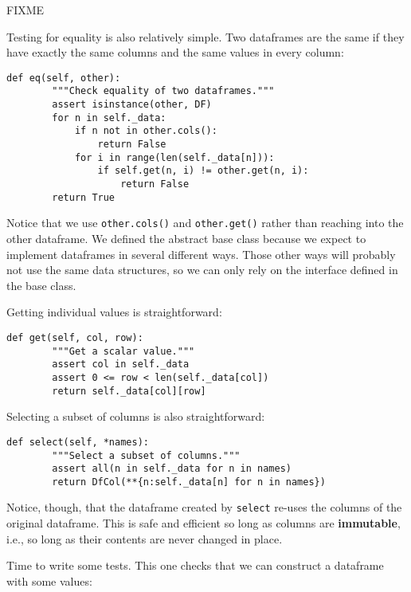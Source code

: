 \documentclass{scrbook}
\newcommand{\glossref}[1]{\textbf{#1}}
\begin{document}
FIXME


Testing for equality is also relatively simple.
Two dataframes are the same if they have exactly the same columns
and the same values in every column:


\begin{lstlisting}[frame=single,frameround=tttt]
    def eq(self, other):
        """Check equality of two dataframes."""
        assert isinstance(other, DF)
        for n in self._data:
            if n not in other.cols():
                return False
            for i in range(len(self._data[n])):
                if self.get(n, i) != other.get(n, i):
                    return False
        return True
\end{lstlisting}



\noindent Notice that we use \texttt{other.cols()} and \texttt{other.get()}
rather than reaching into the other dataframe.
We defined the abstract base class because
we expect to implement dataframes in several different ways.
Those other ways will probably not use the same data structures,
so we can only rely on the interface defined in the base class.


Getting individual values is straightforward:


\begin{lstlisting}[frame=single,frameround=tttt]
    def get(self, col, row):
        """Get a scalar value."""
        assert col in self._data
        assert 0 <= row < len(self._data[col])
        return self._data[col][row]
\end{lstlisting}



\noindent Selecting a subset of columns is also straightforward:


\begin{lstlisting}[frame=single,frameround=tttt]
    def select(self, *names):
        """Select a subset of columns."""
        assert all(n in self._data for n in names)
        return DfCol(**{n:self._data[n] for n in names})
\end{lstlisting}



\noindent Notice,
though,
that the dataframe created by \texttt{select}
re-uses the columns of the original dataframe.
This is safe and efficient so long as columns are \glossref{immutable},
i.e.,
so long as their contents are never changed in place.


Time to write some tests.
This one checks that we can construct a dataframe with some values:
\end{document}
